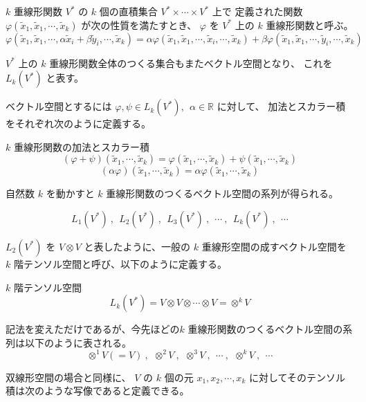 \documentclass[uplatex,a4j,12pt,dvipdfmx]{jsarticle}
\begin{document}
\begin{itembox}[l]{$k$ 重線形関数}
	$V^{*}$ の $k$ 個の直積集合 $V^{*} \times \cdots \times V^{*}$ 上で
	定義された関数
	$\varphi(\tilde{x}_{1}, \tilde{x}_{1}, \cdots , \tilde{x}_{k})$
	が次の性質を満たすとき、
	$\varphi$ を $V^{*}$ 上の $k$ 重線形関数と呼ぶ。
	$$
		\varphi(\tilde{x}_{1}, \tilde{x}_{1}, \cdots , \alpha \tilde{x}_{i} + \beta \tilde{y}_{i} , \cdots , \tilde{x}_{k})
		=
		\alpha \varphi(\tilde{x}_{1}, \tilde{x}_{1}, \cdots , \tilde{x}_{i} , \cdots , \tilde{x}_{k})
		+
		\beta \varphi(\tilde{x}_{1}, \tilde{x}_{1}, \cdots , \tilde{y}_{i} , \cdots , \tilde{x}_{k})
	$$
\end{itembox}

$V^{*}$ 上の $k$ 重線形関数全体のつくる集合もまたベクトル空間となり、
これを
$L_{k}(V^{*})$
と表す。

ベクトル空間とするには
$\varphi, \psi \in L_{k}(V^{*}) , \ \ \alpha \in \mathbb{R}$ に対して、
加法とスカラー積をそれぞれ次のように定義する。

\begin{itembox}[l]{$k$ 重線形関数の加法とスカラー積}
	$$
		( \varphi + \psi ) ( \tilde{x}_{1} , \cdots, \tilde{x}_{k})
		=
		\varphi ( \tilde{x}_{1} , \cdots, \tilde{x}_{k})
		+
		\psi ( \tilde{x}_{1} , \cdots, \tilde{x}_{k})
	$$
	$$
		( \alpha  \varphi ) ( \tilde{x}_{1} , \cdots, \tilde{x}_{k})
		=
		\alpha \varphi ( \tilde{x}_{1} , \cdots, \tilde{x}_{k})
	$$
\end{itembox}

自然数 $k$ を動かすと $k$ 重線形関数のつくるベクトル空間の系列が得られる。

$$
	L_{1}(V^{*}) \ , \ \ L_{2}(V^{*}) \ , \ \ L_{3}(V^{*}) \ , \ \ \cdots \ , \ \ L_{k}(V^{*}) \ , \ \ \cdots
$$

$L_{2}(V^{*})$ を $V \otimes V$ と表したように、一般の $k$ 重線形空間の成すベクトル空間を
$k$ 階テンソル空間と呼び、以下のように定義する。

\begin{itembox}[l]{$k$ 階テンソル空間}
	$$L_{k}(V^{*}) = V \otimes V \otimes \cdots \otimes V = \otimes^{k} V$$
\end{itembox}

記法を変えただけであるが、今先ほどの$k$ 重線形関数のつくるベクトル空間の系列は以下のように表される。
$$
	\otimes^{1} V (= V) \ , \ \ \otimes^{2} V \ , \ \ \otimes^{3} V \ , \ \ \cdots \ , \ \ \otimes^{k} V \ , \ \ \cdots
$$

双線形空間の場合と同様に、
$V$ の $k$ 個の元 $x_{1}, x_{2} , \cdots , x_{k}$ に対してそのテンソル積は次のような写像であると定義できる。
\end{document}
